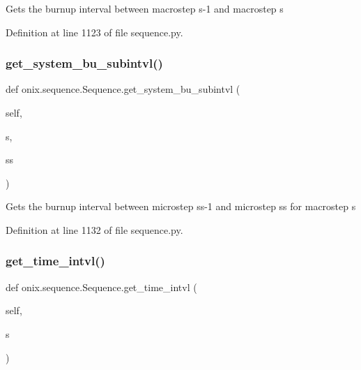 \begin{DoxyVerb}Gets the burnup interval between macrostep s-1 and macrostep s\end{DoxyVerb}
 

Definition at line 1123 of file sequence.\+py.

\mbox{\label{classonix_1_1sequence_1_1Sequence_ad7f3dab9f85da67314654f68923f7812}} 
\subsubsection{\texorpdfstring{get\+\_\+system\+\_\+bu\+\_\+subintvl()}{get\_system\_bu\_subintvl()}}
{\footnotesize\ttfamily def onix.\+sequence.\+Sequence.\+get\+\_\+system\+\_\+bu\+\_\+subintvl (\begin{DoxyParamCaption}\item[{}]{self,  }\item[{}]{s,  }\item[{}]{ss }\end{DoxyParamCaption})}

\begin{DoxyVerb}Gets the burnup interval between microstep ss-1 and microstep ss for macrostep s\end{DoxyVerb}
 

Definition at line 1132 of file sequence.\+py.

\mbox{\label{classonix_1_1sequence_1_1Sequence_a418b4785a15e01ba6ac87465882ad75a}} 
\subsubsection{\texorpdfstring{get\+\_\+time\+\_\+intvl()}{get\_time\_intvl()}}
{\footnotesize\ttfamily def onix.\+sequence.\+Sequence.\+get\+\_\+time\+\_\+intvl (\begin{DoxyParamCaption}\item[{}]{self,  }\item[{}]{s }\end{DoxyParamCaption})}

